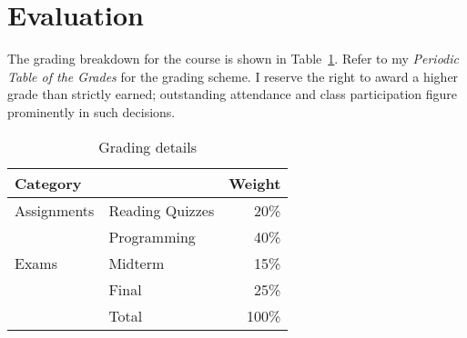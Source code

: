 \documentclass[11pt]{article}
\begin{document}


\section{Evaluation}

The grading breakdown for the course
is shown in Table~\ref{tab:grading}.
Refer to my \emph{Periodic Table of the Grades}
for the grading scheme.
I reserve the right to award a higher grade than strictly earned;
outstanding attendance and class participation
figure prominently in such decisions.

\begin{table}[htb]
  \centering
  \begin{tabular}{llr}
    \toprule
    Category    &                 & Weight \\
    \midrule
    Assignments & Reading Quizzes & 20\%   \\
                & Programming     & 40\%   \\
    Exams       & Midterm         & 15\%   \\
                & Final           & 25\%   \\
    \midrule
                & Total           & 100\%  \\
    \bottomrule
  \end{tabular}
  \caption{Grading details}
  \label{tab:grading}
\end{table}
\begin{comment}
  #+ORGTBL: SEND grades orgtbl-to-latex :splice nil :skip 0 :booktabs t
  | Category    |                 | Weight |
  |             |                 |    <r> |
  |-------------+-----------------+--------|
  | Assignments | Reading Quizzes |    20%
  |             | Programming     |    40%
  | Exams       | Midterm         |    15%
  |             | Final           |    25%
  |-------------+-----------------+--------|
  |             | Total           |   100%
  #+TBLFM: @7$3=100*vsum(@I..II);%
\end{comment}



\lastupdated
\end{document}

